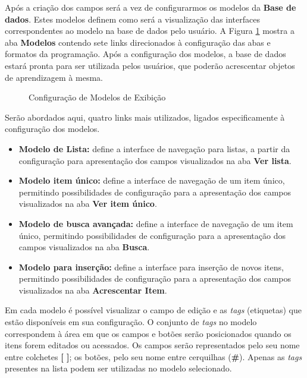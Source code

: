 Após a criação dos campos será a vez de configurarmos os modelos da \textbf{Base de dados}. Estes modelos definem como será a visualização das interfaces correspondentes ao modelo na base de dados pelo usuário. A Figura \ref{fig:cap5_11} mostra a aba \textbf{Modelos} contendo sete links direcionados à configuração das abas e formatos da programação. Após a configuração dos modelos, a base de dados estará pronta para ser utilizada pelos usuários, que poderão acrescentar objetos de aprendizagem à mesma.
\begin{figure}[htbp]
 \begin{center}
  \caption{Configuração de Modelos de Exibição}
  \label{fig:cap5_11}
 \end{center}
\end{figure}
Serão abordados aqui, quatro links mais utilizados, ligados especificamente à configuração dos modelos.
\begin{itemize}
 \item \textbf{Modelo de Lista:} define a interface de navegação para listas, a partir da configuração para apresentação dos campos visualizados na aba \textbf{Ver lista}.
 \item \textbf{Modelo item único:} define a interface de navegação de um item único, permitindo possibilidades de configuração para a apresentação dos campos visualizados na aba \textbf{Ver item único}.
 \item \textbf{Modelo de busca avançada:} define a interface de navegação de um item único, permitindo possibilidades de configuração para a apresentação dos campos visualizados na aba \textbf{Busca}.
 \item \textbf{Modelo para inserção:} define a interface para inserção de novos itens, permitindo possibilidades de configuração para a apresentação dos campos visualizados na aba \textbf{Acrescentar Item}.
\end{itemize}

Em cada modelo é possível visualizar o campo de edição e as \textit{tags} (etiquetas) que estão disponíveis em sua configuração. O conjunto de \textit{tags} no modelo correspondem à área em que os campos e botões serão posicionados quando os itens forem editados ou acessados. Os campos serão representados pelo seu nome entre colchetes \textbf{[ ]}; os botões, pelo seu nome entre cerquilhas (\textbf{\#}). Apenas as \textit{tags} presentes na lista podem ser utilizadas no modelo selecionado.
	
